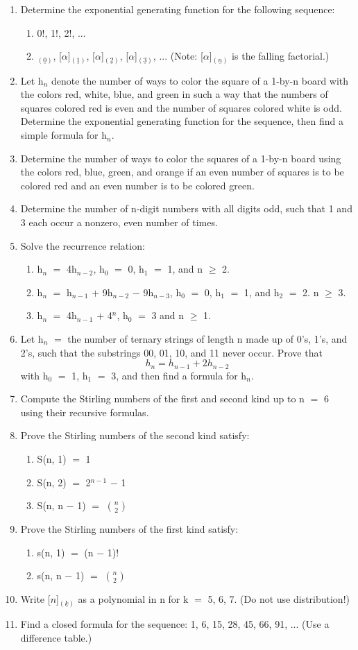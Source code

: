 \documentclass{article}
\newcommand{\mt}[1]{\ensuremath{#1}}
\newcommand{\balist}{\begin{enumerate}[label=\alph*.]}
\newcommand{\elist}{\end{enumerate}}
\newcommand{\ps}{\mt{+} }
\newcommand{\ms}{\mt{-} }
\newcommand{\gre}{\mt{\geq} }
\newcommand{\eql}{\mt{=} }
\newcommand{\uw}[2]{#1\mt{_{#2}}}
\newcommand{\uf}[2]{#1\mt{^{#2}}}
\newcommand{\nck}[2]{\mt{{#1 \choose #2}}}
\newcommand{\eqn}[1]{\[#1\]}
\newcommand{\ff}[2]{[\mt{#1}]\mt{_{(\underline{#2})}}}
\begin{document}
\begin{enumerate}
   \item Determine the exponential generating function for the following sequence:
   \balist
   \item 0!, 1!, 2!, ...
   \item \ff{\alpha}{0}, \ff{\alpha}{1}, \ff{\alpha}{2}, \ff{\alpha}{3}, ... (Note: \ff{\alpha}{n} is the falling factorial.)
   \elist
   \item Let \uw{h}{n} denote the number of ways to color the square of a 1-by-n board with the colors red, white, blue, and green in such a way that the numbers of squares colored red is even and the number of squares colored white is odd. Determine the exponential generating function for the sequence, then find a simple formula for \uw{h}{n}.
   \item Determine the number of ways to color the squares of a 1-by-n board using the colors red, blue, green, and orange if an even number of squares is to be colored red and an even number is to be colored green.
   \item Determine the number of n-digit numbers with all digits odd, such that 1 and 3 each occur a nonzero, even number of times.
   \item Solve the recurrence relation:
   \balist
   \item \uw{h}{n} \eql 4\uw{h}{n - 2}, \uw{h}{0} \eql 0, \uw{h}{1} \eql 1, and n \gre 2.
   \item \uw{h}{n} \eql \uw{h}{n - 1} \ps 9\uw{h}{n - 2} \ms 9\uw{h}{n - 3}, \uw{h}{0} \eql 0, \uw{h}{1} \eql 1, and \uw{h}{2} \eql 2. n \gre 3.
   \item \uw{h}{n} \eql 4\uw{h}{n - 1} \ps \uf{4}{n}, \uw{h}{0} \eql 3 and n \gre 1.
   \elist
   \item Let \uw{h}{n} \eql the number of ternary strings of length n made up of 0's, 1's, and 2's, such that the substrings 00, 01, 10, and 11 never occur. Prove that
   \eqn{h_n = h_{n - 1} + 2h_{n - 2}}
   with \uw{h}{0} \eql 1, \uw{h}{1} \eql 3, and then find a formula for \uw{h}{n}.
   \item Compute the Stirling numbers of the first and second kind up to n \eql 6 using their recursive formulas.
   \item Prove the Stirling numbers of the second kind satisfy:
   \balist
   \item S(n, 1) \eql 1
   \item S(n, 2) \eql \uf{2}{n - 1} \ms 1
   \item S(n, n \ms 1) \eql \nck{n}{2}
   \elist
   \item Prove the Stirling numbers of the first kind satisfy:
   \balist
   \item s(n, 1) \eql (n \ms 1)!
   \item s(n, n \ms 1) \eql \nck{n}{2}
   \elist
   \item Write \ff{n}{k} as a polynomial in n for k \eql 5, 6, 7. (Do not use distribution!)
   \item Find a closed formula for the sequence: 1, 6, 15, 28, 45, 66, 91, ... (Use a difference table.)
\end{enumerate}
\end{document}
